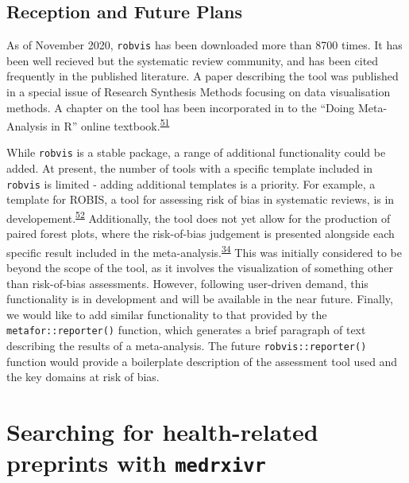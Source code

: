 \documentclass[a4paper, twoside]{templates/ociamthesis}
\begin{document}
\hypertarget{reception-and-future-plans}{%
\subsection{Reception and Future Plans}\label{reception-and-future-plans}}

As of November 2020, \texttt{robvis} has been downloaded more than 8700 times. It has been well recieved but the systematic review community, and has been cited frequently in the published literature. A paper describing the tool was published in a special issue of Research Synthesis Methods focusing on data visualisation methods. A chapter on the tool has been incorporated in to the ``Doing Meta-Analysis in R'' online textbook.\textsuperscript{\protect\hyperlink{ref-mathias_harrer_2019_2551803}{51}}

While \texttt{robvis} is a stable package, a range of additional functionality could be added. At present, the number of tools with a specific template included in \texttt{robvis} is limited - adding additional templates is a priority. For example, a template for ROBIS, a tool for assessing risk of bias in systematic reviews, is in developement.\textsuperscript{\protect\hyperlink{ref-whiting2016robis}{52}} Additionally, the tool does not yet allow for the production of paired forest plots, where the risk-of-bias judgement is presented alongside each specific result included in the meta-analysis.\textsuperscript{\protect\hyperlink{ref-cochranechpt7}{34}} This was initially considered to be beyond the scope of the tool, as it involves the visualization of something other than risk-of-bias assessments. However, following user-driven demand, this functionality is in development and will be available in the near future. Finally, we would like to add similar functionality to that provided by the \texttt{metafor::reporter()} function, which generates a brief paragraph of text describing the results of a meta-analysis. The future \texttt{robvis::reporter()} function would provide a boilerplate description of the assessment tool used and the key domains at risk of bias.

\hypertarget{searching-for-health-related-preprints-with-medrxivr}{%
\section{\texorpdfstring{Searching for health-related preprints with \texttt{medrxivr}}{Searching for health-related preprints with medrxivr}}\label{searching-for-health-related-preprints-with-medrxivr}}
\end{document}
